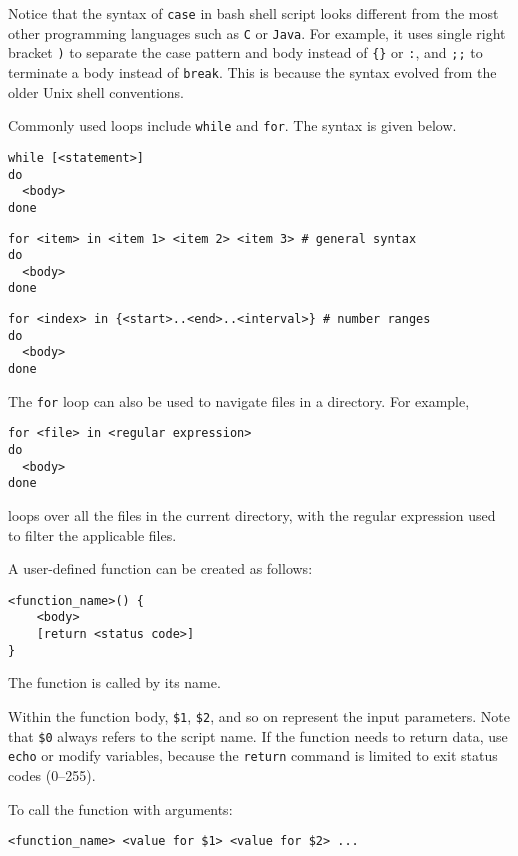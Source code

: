 Notice that the syntax of \verb|case| in bash shell script looks different from the most other programming languages such as \verb|C| or \verb|Java|. For example, it uses single right bracket \verb|)| to separate the case pattern and body instead of \verb|{}| or \verb|:|, and \verb|;;| to terminate a body instead of \verb|break|. This is because the syntax evolved from the older Unix shell conventions.

Commonly used loops include \verb|while| and \verb|for|. The syntax is given below.

\begin{lstlisting}
while [<statement>]
do
  <body>
done
\end{lstlisting}

\begin{lstlisting}
for <item> in <item 1> <item 2> <item 3> # general syntax
do
  <body>
done
\end{lstlisting}

\begin{lstlisting}
for <index> in {<start>..<end>..<interval>} # number ranges
do
  <body>
done
\end{lstlisting}

The \verb|for| loop can also be used to navigate files in a directory. For example,
\begin{lstlisting}
for <file> in <regular expression>
do
  <body>
done
\end{lstlisting}
loops over all the files in the current directory, with the regular expression used to filter the applicable files.

A user-defined function can be created as follows:
\begin{lstlisting}
<function_name>() {
    <body>
    [return <status code>]
}
\end{lstlisting}

The function is called by its name.

Within the function body, \verb|$1|, \verb|$2|, and so on represent the input parameters. Note that \verb|$0| always refers to the script name. If the function needs to return data, use \verb|echo| or modify variables, because the \verb|return| command is limited to exit status codes (0–255).

To call the function with arguments:
\begin{lstlisting}
<function_name> <value for $1> <value for $2> ...
\end{lstlisting}














